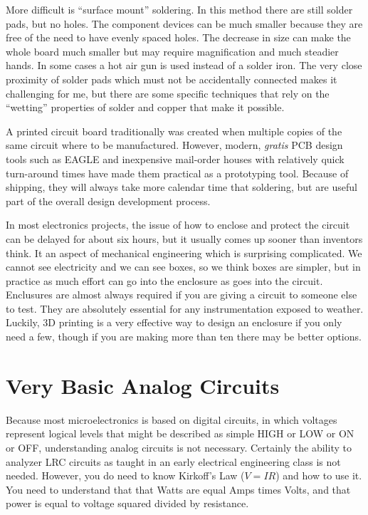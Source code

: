 \documentclass[
	fontsize=10pt, %
	twoside=false, %
	secnumdepth=1, %
]{kaobook}
\begin{document}
More difficult is ``surface mount'' soldering. In this method
there are still solder pads, but no holes. The component devices
can be much smaller because they are free of the need to have
evenly spaced holes. The decrease in size can make the whole board
much smaller but may require magnification and much steadier hands.
In some cases a hot air gun is used instead of a solder iron.
The very close proximity of solder pads which must not be accidentally
connected makes it challenging for me, but there are some specific
techniques that rely on the ``wetting'' properties of solder and
copper that make it possible.

A printed circuit board traditionally was created when multiple copies of the same
circuit where to be manufactured. However, modern, {\em gratis} PCB design
tools such as EAGLE\cite{eaglecad} and inexpensive mail-order houses with
relatively quick turn-around times have made them practical
as a prototyping tool. Because of shipping, they will always
take more calendar time that soldering, but are useful part of the
overall design development process.

In most electronics projects, the issue of how to enclose and
protect the circuit can be delayed for about six hours, but
it usually comes up sooner than inventors think. It an aspect
of mechanical engineering which is surprising complicated.
We cannot see electricity and we can see boxes, so we think
boxes are simpler, but in practice as much effort can go into
the enclosure as goes into the circuit. Enclusures are almost
always required if you are giving a circuit to someone else to
test. They are absolutely essential for any instrumentation
exposed to weather. Luckily, 3D printing is a very effective
way to design an enclosure if you only need a few, though
if you are making more than ten there may be better options.

\section{Very Basic Analog Circuits}

Because most microelectronics is based on digital circuits,
in which voltages represent logical levels that might be
described as simple HIGH or LOW or ON or OFF, understanding
analog circuits is not necessary.
Certainly the ability to analyzer LRC circuits as taught
in an early electrical engineering class is not needed.
However, you do need to know Kirkoff's Law ($ V= IR$) and how to
use it. You need to understand that that Watts are equal
Amps times Volts, and that power is equal to voltage squared
divided by resistance.
\end{document}
